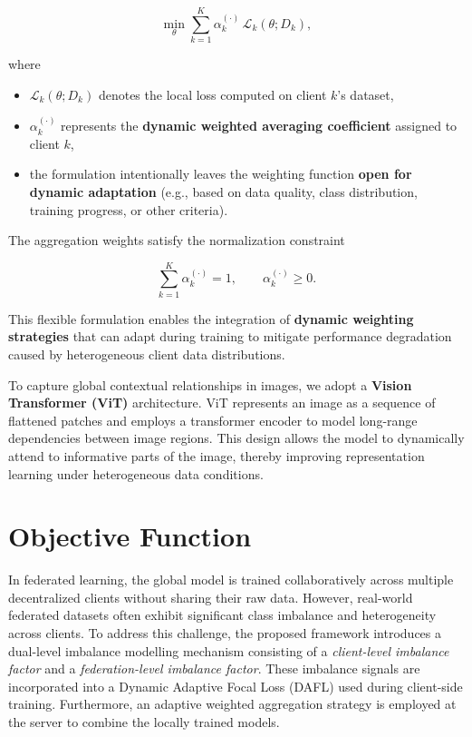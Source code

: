 \documentclass[12pt]{book}
\begin{document}
\begin{equation}
\min_{\theta} \sum_{k=1}^{K} \alpha_k^{(\cdot)} \, \mathcal{L}_k(\theta; D_k),
\end{equation}

where

\begin{itemize}
    \item $\mathcal{L}_k(\theta; D_k)$ denotes the local loss computed on client $k$'s dataset,
    \item $\alpha_k^{(\cdot)}$ represents the \textbf{dynamic weighted averaging coefficient} assigned to client $k$,
    \item the formulation intentionally leaves the weighting function \textbf{open for dynamic adaptation} (e.g., based on data quality, class distribution, training progress, or other criteria).
\end{itemize}

The aggregation weights satisfy the normalization constraint

\begin{equation}
\sum_{k=1}^{K} \alpha_k^{(\cdot)} = 1, \qquad \alpha_k^{(\cdot)} \ge 0 .
\end{equation}

This flexible formulation enables the integration of \textbf{dynamic weighting strategies} that can adapt during training to mitigate performance degradation caused by heterogeneous client data distributions.

To capture global contextual relationships in images, we adopt a \textbf{Vision Transformer (ViT)} architecture. ViT represents an image as a sequence of flattened patches and employs a transformer encoder to model long-range dependencies between image regions. This design allows the model to dynamically attend to informative parts of the image, thereby improving representation learning under heterogeneous data conditions.


\section{Objective Function}
In federated learning, the global model is trained collaboratively across multiple decentralized clients without sharing their raw data. However, real-world federated datasets often exhibit significant class imbalance and heterogeneity across clients. To address this challenge, the proposed framework introduces a dual-level imbalance modelling mechanism consisting of a \textit{client-level imbalance factor} and a \textit{federation-level imbalance factor}. These imbalance signals are incorporated into a Dynamic Adaptive Focal Loss (DAFL) used during client-side training. Furthermore, an adaptive weighted aggregation strategy is employed at the server to combine the locally trained models.
\end{document}
